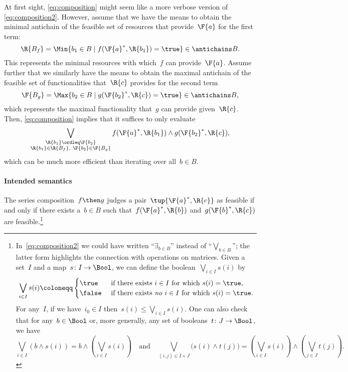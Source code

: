 \begin{remark}
    At first sight, \cref{eq:composition} might seem like a more verbose version of \cref{eq:composition2}. However, assume that we have the means to obtain the minimal antichain of the feasible set of resources that provide~$\F{a}$ for the first term:
    \begin{equation*}
        \R{B_f} = \Min \{b_1\in B \mid f(\F{a}^*,\R{b_1})=\true\} \in \antichains B.
    \end{equation*}
    This represents the minimal resources with which~$f$ can provide~$\F{a}$. Assume further that we similarly have the means to obtain the maximal antichain of the feasible set of functionalities that~$\R{c}$ provides for the second term
    \begin{equation*}
        \F{B_g} = \Max \{b_2\in B \mid g(\F{b_2}^*,\R{c})=\true\} \in \antichains B,
    \end{equation*}
    which represents the maximal functionality that~$g$ can provide given~$\R{c}$. Then, \cref{eq:composition} implies that it suffices to only evaluate
    \begin{equation*}
        \bigvee_{\substack{\R{b_1}\ordleq\F{b_2} \\ \R{b_1}\in \R{B_f},~ \F{b_2}\in\F{B_g} }} f(\F{a}^*,\R{b_1}) \wedge g(\F{b_2}^*,\R{c}),
    \end{equation*}
    which can be much more efficient than iterating over all~$b\in B$.
\end{remark}

\paragraph{Intended semantics}
The series composition~$f\then g$ judges a pair~$\tup{\F{a}^*,\R{c}}$ as feasible if and only if there exists a~$b \in B$ such that~$f(\F{a}^*,\R{b})$ and~$g(\F{b}^*,\R{c})$ are feasible.\footnote{In~\cref{eq:composition2} we could have written ``$\exists_{b\in B}$''
instead of ``$\bigvee_{b\in B}$''; the latter form highlights the connection
with operations on matrices. Given a set~$I$ and a map~$s\colon I\to\Bool$, we can define the boolean~$\bigvee_{i\in I}s(i)$ by
    \begin{equation*}
        \bigvee_{i\in I}s(i)\coloneqq
        \begin{cases}
            \true&\text{ if there exists }i\in I\text{ for which }s(i)=\true,\\
            \false&\text{ if there exists \emph{no} }i\in I\text{ for which }s(i)=\true.
        \end{cases}
    \end{equation*}
    For any~$I$, if we have~$i_0\in I$ then~$s(i)\leq\bigvee_{i\in I}s(i)$. One can also check that for any~$b\in\Bool$ or, more generally, any set of booleans~$t\colon J\to\Bool$, we have
    \begin{equation*}
        \bigvee_{i\in I}(b\wedge s(i))=b\wedge\left(\bigvee_{i\in I}s(i)\right)
        \quad\text{and}\quad
        \bigvee_{(i,j)\in I\times  J}\big(s(i)\wedge t(j)\big)=\left(\bigvee_{i\in I}s(i)\right)\wedge\left(\bigvee_{j\in J} t(j)\right).
    \end{equation*}
}

